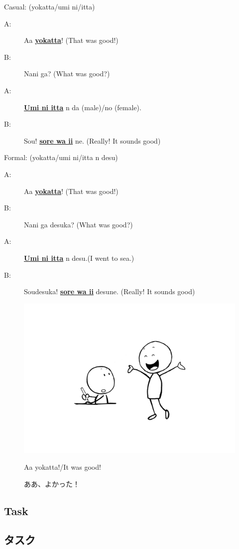 \documentclass[uplatex,dvipdfmx,b5paper,english,10pt]{jsbook}
\begin{document}
\begin{description}
\item Casual: (yokatta/umi ni/itta)
\begin{description}
 \item[A:] Aa \underline{{\bfseries yokatta}}! (That was good!)
 \item[B:] Nani ga? (What was good?)
 \item[A:] \underline{{\bfseries Umi ni itta}} n da (male)/no (female).
 \item[B:] Sou! \underline{{\bfseries sore wa ii}} ne. (Really! It sounds good)
\end{description}

\vspace{1\baselineskip}

\item Formal: (yokatta/umi ni/itta n desu)
\begin{description}
 \item[A:] Aa \underline{{\bfseries yokatta}}! (That was good!)
 \item[B:] Nani ga desuka? (What was good?)
 \item[A:] \underline{{\bfseries Umi ni itta}} n desu.(I went to sea.)
 \item[B:] Soudesuka! \underline{{\bfseries sore wa ii}} desune. (Really! It sounds good)
\end{description}
\end{description}

\begin{figure}[h]
  \begin{center}
\includegraphics[trim=200 130 200 150, clip, width=.3\hsize]{img/T51NaturalSpeech04image.png}
  \end{center}
  \ifEnglish
  \caption{Aa yokatta!/It was good!}
  \else
  \caption{ああ、よかった！}
  \fi
  \label{fig:aayokatta}
\end{figure}



\ifEnglish
\subsection{Task}
\else
\subsection{タスク}
\fi
\end{document}
